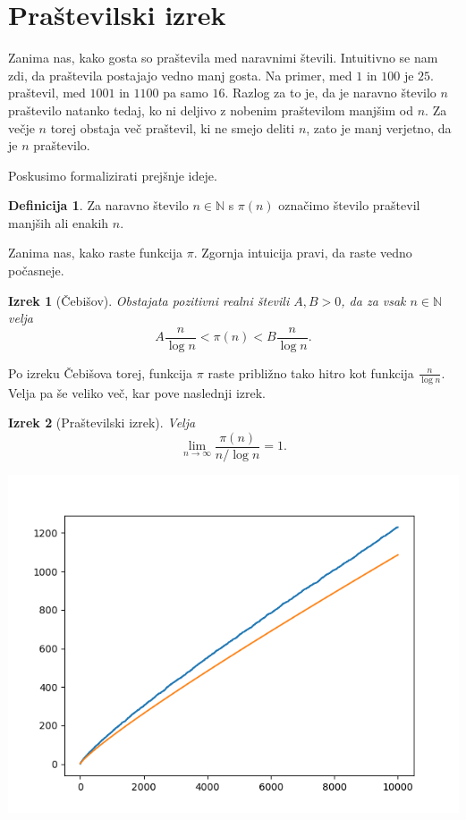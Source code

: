 \documentclass[a4paper,12pt]{article}
\def\N{\mathbb{N}}
\theoremstyle{definition}
\newtheorem{definicija}{Definicija}
\theoremstyle{plain}
\newtheorem{izrek}{Izrek}
\begin{document}
\section{Praštevilski izrek}
Zanima nas, kako gosta so praštevila med naravnimi števili. Intuitivno se nam zdi, da praštevila postajajo vedno manj gosta. Na primer, med $1$ in $100$ je $25$. praštevil, med $1001$ in $1100$ pa samo $16$. Razlog za to je, da je naravno število $n$ praštevilo natanko tedaj, ko ni deljivo z nobenim praštevilom manjšim od $n$. Za večje $n$ torej obstaja več praštevil, ki ne smejo deliti $n$, zato je manj verjetno, da je $n$ praštevilo.

Poskusimo formalizirati prejšnje ideje.
\begin{definicija}
    Za naravno število $n \in \N$ s $\pi(n)$ označimo število praštevil manjših ali enakih $n$.
\end{definicija}
Zanima nas, kako raste funkcija $\pi$. Zgornja intuicija pravi, da raste vedno počasneje.

\begin{izrek}[Čebišov]
    Obstajata pozitivni realni števili $A, B > 0$, da za vsak $n \in \N$ velja $$A\frac{n}{\log{n}} < \pi(n) < B\frac{n}{\log{n}}.$$
\end{izrek}

Po izreku Čebišova torej, funkcija $\pi$ raste približno tako hitro kot funkcija $\frac{n}{\log{n}}$. Velja pa še veliko več, kar pove naslednji izrek.

\begin{izrek}[Praštevilski izrek]
    Velja $$\lim_{n \rightarrow \infty} \frac{\pi(n)}{n / \log{n}} = 1.$$
\end{izrek}

\begin{center}
    \includegraphics[scale=0.8]{graf1.png}
\end{center}
\end{document}
